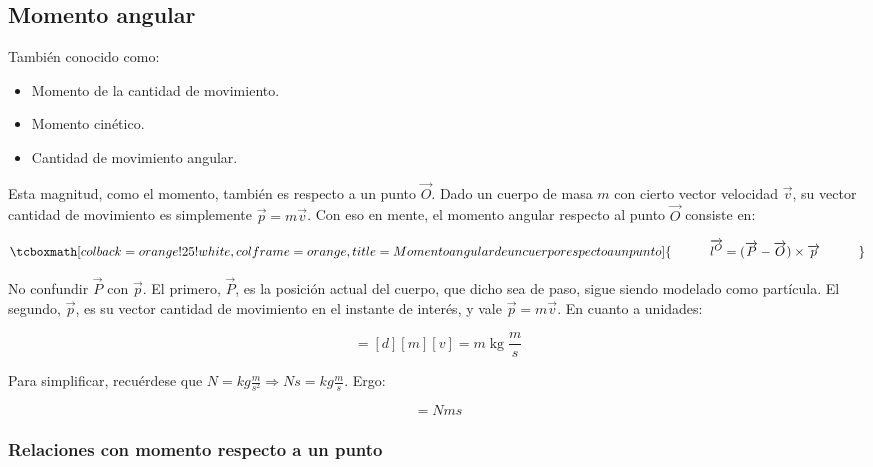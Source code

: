 \documentclass{article}
\begin{document}
\subsection{Momento angular}

También conocido como:

\begin{itemize}
\item Momento de la cantidad de movimiento.
\item Momento cinético.
\item Cantidad de movimiento angular.
\end{itemize}

Esta magnitud, como el momento, también es respecto a un punto $\overrightarrow{O}$. Dado un cuerpo de masa $m$ con cierto vector velocidad $\overrightarrow{v}$, su vector cantidad de movimiento es simplemente $\overrightarrow{p} = m \overrightarrow{v}$. Con eso en mente, el momento angular respecto al punto $\overrightarrow{O}$ consiste en:

\begin{equation}
\tcboxmath[colback=orange!25!white,colframe=orange,title=Momento angular de un cuerpo respecto a un punto]{
\quad \quad \quad \overrightarrow{l^O} = (\overrightarrow{P} - \overrightarrow{O}) \times \overrightarrow{p} \quad \quad \quad
}
\end{equation}

No confundir $\overrightarrow{P}$ con $\overrightarrow{p}$. El primero, $\overrightarrow{P}$, es la posición actual del cuerpo, que dicho sea de paso, sigue siendo modelado como partícula. El segundo, $\overrightarrow{p}$, es su vector cantidad de movimiento en el instante de interés, y vale $\overrightarrow{p} = m \overrightarrow{v}$. En cuanto a unidades:

\begin{equation}
[\overrightarrow{l^O}] = [d] [m] [v] = m \mathop{kg} \frac{m}{s}
\end{equation}

Para simplificar, recuérdese que $N = kg \frac{m}{s^2} \Rightarrow N s = kg \frac{m}{s}$. Ergo:

\begin{equation}
[\overrightarrow{l^O}] = N m s
\end{equation}

\subsubsection{Relaciones con momento respecto a un punto}
\end{document}
